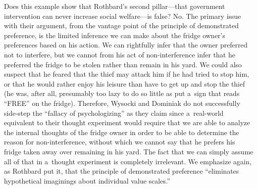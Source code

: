 Does this example show that Rothbard's second pillar---that government intervention can never increase social welfare---is false? No. The primary issue with their argument, from the vantage point of the principle of demonstrated preference, is the limited inference we can make about the fridge owner's preferences based on his action. We can rightfully infer that the owner preferred not to interfere, but we cannot from his act of non-interference infer that he preferred the fridge to be stolen rather than remain in his yard. We could also suspect that he feared that the thief may attack him if he had tried to stop him, or that he would rather enjoy his leisure than have to get up and stop the thief (he was, after all, presumably too lazy to do so little as put a~sign that reads ``FREE'' on the fridge). Therefore, Wysocki and Dominiak do not successfully side-step the ``fallacy of psychologizing'' as they claim since a~real-world equivalent to their thought experiment would require that we are able to analyze the internal thoughts of the fridge owner in order to be able to determine the reason for non-interference, without which we cannot say that he prefers his fridge taken away over remaining in his yard. The fact that we can simply assume all of that in a~thought experiment is completely irrelevant. We emphasize again, as Rothbard 
\parencite*[][p.320]{rothbard_toward_2011} %
 put it, that the principle of demonstrated preference ``eliminates hypothetical imaginings about individual value scales.''



